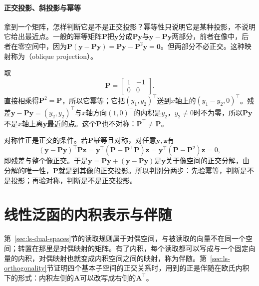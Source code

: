 \paragraph{正交投影、斜投影与幂等}
拿到一个矩阵，怎样判断它是不是正交投影？幂等性只说明它是某种投影，不说明它给出最近点。一般的幂等矩阵$\bm P$把$\bm y$分成$\bm P\bm y$与$\bm y-\bm P\bm y$两部分，前者在像中，后者在零空间中，因为$\bm P(\bm y-\bm P\bm y)=\bm P\bm y-\bm P^2\bm y=\bm0$。但两部分不必正交。这种映射称为（oblique projection）。

\begin{example}[反例：幂等而不对称的投影]
\label{ex:ls-oblique-projection}
取
\[
 \bm P=\begin{bmatrix}1&-1\\0&0\end{bmatrix}.
\]
直接相乘得$\bm P^2=\bm P$，所以它幂等；它把$(y_1,y_2)^\top$送到$x$轴上的$(y_1-y_2,0)^\top$。残差$\bm y-\bm P\bm y=(y_2,y_2)^\top$与$x$轴方向$(1,0)^\top$的内积是$y_2$，$y_2\neq0$时不为零，所以$\bm P\bm y$不是$x$轴上离$\bm y$最近的点。这个$\bm P$也不对称：$\bm P^\top\neq\bm P$。
\end{example}

对称性正是正交的条件。若$\bm P$幂等且对称，对任意$\bm y,\bm z$有
\[
 (\bm y-\bm P\bm y)^\top\bm P\bm z=\bm y^\top(\bm P-\bm P^\top\bm P)\bm z=\bm y^\top(\bm P-\bm P^2)\bm z=0,
\]
即残差与整个像正交。于是$\bm y=\bm P\bm y+(\bm y-\bm P\bm y)$是$\bm y$关于像空间的正交分解，由分解的唯一性，$\bm P$就是到其像的正交投影。所以判别分两步：先验幂等，判断是不是投影；再验对称，判断是不是正交投影。

\section{线性泛函的内积表示与伴随}
\label{sec:ls-adjoints}

第~\ref{sec:ls-dual-spaces}节的读取规则属于对偶空间，与被读取的向量不在同一个空间；转置在那里是对偶映射的矩阵。有了内积，每个读取都可以写成与一个固定向量的内积，对偶映射也就变成内积空间之间的映射，称为伴随。第~\ref{sec:ls-orthogonality}节证明四个基本子空间的正交关系时，用到的正是伴随在欧氏内积下的形式：内积左侧的$\bm A$可以改写成右侧的$\bm A^\top$。

